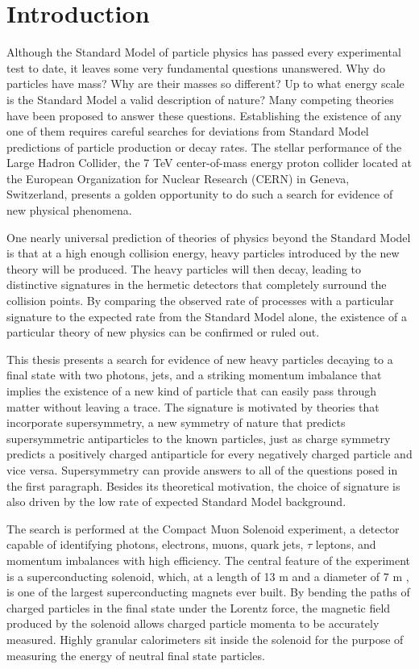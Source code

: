 \documentclass[dissertation.tex]{subfiles}
\begin{document}
\chapter{Introduction}
\label{chap:Introduction}

Although the Standard Model of particle physics has passed every experimental test to date, it leaves some very fundamental questions unanswered.  Why do particles have mass?  Why are their masses so different?  Up to what energy scale is the Standard Model a valid description of nature?  Many competing theories have been proposed to answer these questions.  Establishing the existence of any one of them requires careful searches for deviations from Standard Model predictions of particle production or decay rates.  The stellar performance of the Large Hadron Collider, the 7 TeV center-of-mass energy proton collider located at the European Organization for Nuclear Research (CERN) in Geneva, Switzerland, presents a golden opportunity to do such a search for evidence of new physical phenomena.

One nearly universal prediction of theories of physics beyond the Standard Model is that at a high enough collision energy, heavy particles introduced by the new theory will be produced.  The heavy particles will then decay, leading to distinctive signatures in the hermetic detectors that completely surround the collision points.  By comparing the observed rate of processes with a particular signature to the expected rate from the Standard Model alone, the existence of a particular theory of new physics can be confirmed or ruled out.

This thesis presents a search for evidence of new heavy particles decaying to a final state with two photons, jets, and a striking momentum imbalance that implies the existence of a new kind of particle that can easily pass through matter without leaving a trace.  The signature is motivated by theories that incorporate supersymmetry, a new symmetry of nature that predicts supersymmetric antiparticles to the known particles, just as charge symmetry predicts a positively charged antiparticle for every negatively charged particle and vice versa.  Supersymmetry can provide answers to all of the questions posed in the first paragraph.  Besides its theoretical motivation, the choice of signature is also driven by the low rate of expected Standard Model background.

The search is performed at the Compact Muon Solenoid experiment, a detector capable of identifying photons, electrons, muons, quark jets, $\tau$ leptons, and momentum imbalances with high efficiency.  The central feature of the experiment is a superconducting solenoid, which, at a length of 13 m and a diameter of 7 m \cite{CMS_public}, is one of the largest superconducting magnets ever built.  By bending the paths of charged particles in the final state under the Lorentz force, the magnetic field produced by the solenoid allows charged particle momenta to be accurately measured.  Highly granular calorimeters sit inside the solenoid for the purpose of measuring the energy of neutral final state particles.
\end{document}
